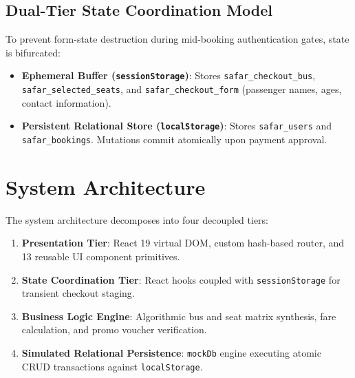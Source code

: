 \documentclass[conference]{IEEEtran}
\begin{document}
\subsection{Dual-Tier State Coordination Model}
To prevent form-state destruction during mid-booking authentication gates, state is bifurcated:
\begin{itemize}
    \item \textbf{Ephemeral Buffer (\texttt{sessionStorage})}: Stores \texttt{safar\_checkout\_bus}, \texttt{safar\_selected\_seats}, and \texttt{safar\_checkout\_form} (passenger names, ages, contact information).
    \item \textbf{Persistent Relational Store (\texttt{localStorage})}: Stores \texttt{safar\_users} and \texttt{safar\_bookings}. Mutations commit atomically upon payment approval.
\end{itemize}

\section{System Architecture}
The system architecture decomposes into four decoupled tiers:
\begin{enumerate}
    \item \textbf{Presentation Tier}: React 19 virtual DOM, custom hash-based router, and 13 reusable UI component primitives.
    \item \textbf{State Coordination Tier}: React hooks coupled with \texttt{sessionStorage} for transient checkout staging.
    \item \textbf{Business Logic Engine}: Algorithmic bus and seat matrix synthesis, fare calculation, and promo voucher verification.
    \item \textbf{Simulated Relational Persistence}: \texttt{mockDb} engine executing atomic CRUD transactions against \texttt{localStorage}.
\end{enumerate}
\end{document}

